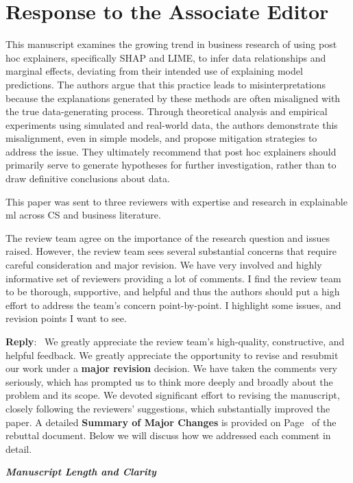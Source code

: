 \documentclass[11pt]{article}
\newcounter{se}[section]
\newenvironment{se*}[1][]{%
    \par\medskip%
    \rmfamily\itshape%
}{\medskip}
\newcounter{aed}[section]
\newenvironment{aed*}[1][]{%
    \par\medskip%
    \rmfamily\itshape%
}{\medskip}
\newcounter{reviewer}
\newcounter{point}[reviewer]
\newcommand{\aesection}
{\newpage
\section*{Response to the Associate Editor}}
\newenvironment{reply}
 {\par\medskip \noindent \begin{sf}\textbf{Reply}:\ }
 {\medskip \end{sf}}
\begin{document}
\aesection{}
\begin{se*}
This manuscript examines the growing trend in business research of using post hoc explainers,
specifically SHAP and LIME, to infer data relationships and marginal effects, deviating from
their intended use of explaining model predictions. The authors argue that this practice leads to
misinterpretations because the explanations generated by these methods are often misaligned
with the true data-generating process. Through theoretical analysis and empirical experiments
using simulated and real-world data, the authors demonstrate this misalignment, even in simple
models, and propose mitigation strategies to address the issue. They ultimately recommend that
post hoc explainers should primarily serve to generate hypotheses for further investigation, rather
than to draw definitive conclusions about data.


This paper was sent to three reviewers with expertise and research in explainable ml across CS
and business literature.


The review team agree on the importance of the research question and issues raised. However,
the review team sees several substantial concerns that require careful consideration and major
revision. We have very involved and highly informative set of reviewers providing a lot of
comments. I find the review team to be thorough, supportive, and helpful and thus the authors
should put a high effort to address the team’s concern point-by-point. I highlight some issues,
and revision points I want to see.
\end{se*}
\begin{reply}
We greatly appreciate the review team’s high-quality, constructive, and helpful feedback. We greatly appreciate the opportunity to revise and resubmit our work under a \textbf{major revision} decision. We have taken the comments very seriously, which has prompted us to think more deeply and broadly about the problem and its scope. We devoted significant effort to revising the manuscript, closely following the reviewers’ suggestions, which substantially improved the paper. A detailed \textbf{Summary of Major Changes} is provided on Page~\pageref{sec:majorchanges} of the rebuttal document. Below we will discuss how we addressed each comment in detail. 


\end{reply}
\begin{aed*}
\textbf{\textit{Manuscript Length and Clarity}}
\end{aed*}
\end{document}
